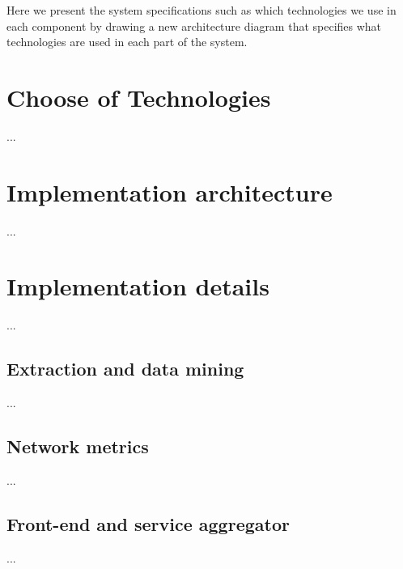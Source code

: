 Here we present the system specifications such as which technologies we use in each component by drawing a new architecture diagram that specifies what technologies are used in each part of the system.

\section{Choose of Technologies}
...
\section{Implementation architecture}
...
\section{Implementation details}
...
\subsection{Extraction and data mining}
...
\subsection{Network metrics}
...
\subsection{Front-end and service aggregator}
...
